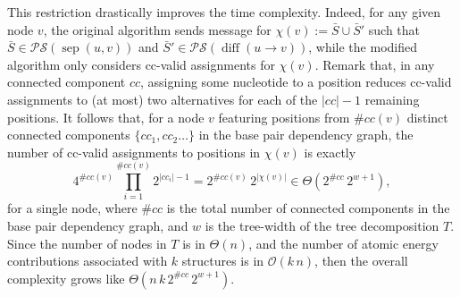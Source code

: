 \documentclass[10pt]{article}
\newcommand{\val}{\bar S} %
\newcommand{\separator}[2]{\operatorname{sep}(#1,#2)}
\newcommand{\difference}[2]{\operatorname{diff}(#1 \rightarrow #2)}
\newcommand{\partseqs}{\mathcal{P\!S}}
\newcommand{\substitute}[2]{#1\cup#2}
\begin{document}
    This restriction drastically improves the time
    complexity. Indeed, for any given node $v$, the original algorithm sends message for
     $\chi(v):=\substitute{\val}{\val'}$ such that
    $\val\in\partseqs(\separator{u}{v})$ and
    $\val'\in\partseqs(\difference{u}{v})$, while the modified algorithm
    only considers cc-valid assignments for $\chi(v)$. Remark that, in any connected component $cc$,
    assigning some nucleotide to a position reduces cc-valid assignments to (at most)
    two alternatives for each of the $|cc|-1$ remaining positions. It follows that, for a node $v$ featuring positions from $\#cc(v)$ distinct connected components $\{cc_1,cc_2\ldots\}$ in the base pair dependency graph, the number of cc-valid assignments to positions in $\chi(v)$ is exactly
    $$4^{\#cc(v)}\prod_{i=1}^{\#cc(v)} 2^{|cc_i|-1} = 2^{\#cc(v)}\, 2^{|\chi(v)|} \in \Theta(2^{\#cc}\, 2^{w+1}),$$
    for a single node, where $\#cc$ is the total number of connected components in the base pair dependency graph, and $w$ is the tree-width of the tree decomposition $T$. Since the number of nodes in $T$ is in $\Theta(n)$, and the number of atomic energy contributions associated with $k$ structures is in $\mathcal{O}(k\,n)$, then the overall complexity grows like $\Theta(n\, k\, 2^{\#cc}\, 2^{w+1})$.

\end{document}
